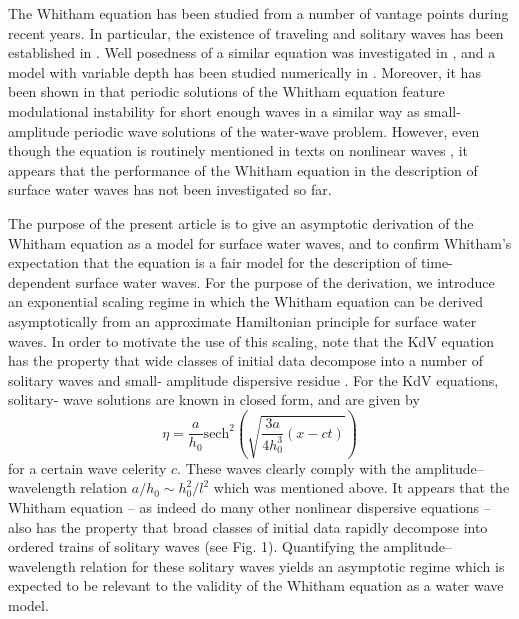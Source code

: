 The Whitham equation has been studied from a number of
vantage points during recent years. In particular, the existence of
traveling and solitary waves has been established in \citep{Ehrnstrom2012, Ehrnstrom2009}.
Well posedness of a similar equation was investigated in \citetext{\citealp[]{Lannes2013}-\citealp[]{Klein2015}}, and a
model with variable depth has been studied numerically in \cite{Minzoni2013}.
Moreover, it has been shown in \citep{Hur2015, Sanford2014} that periodic solutions of
the Whitham equation feature modulational instability for short
enough waves in a similar way as small-amplitude periodic wave
solutions of the water-wave problem. However, even though the
equation is routinely mentioned in texts on nonlinear waves \citep{Drazin89, Whitham74}, it appears that the performance of the Whitham equation in
the description of surface water waves has not been investigated
so far.


The purpose of the present article is to give an asymptotic
derivation of the Whitham equation as a model for surface water
waves, and to confirm Whitham’s expectation that the equation is
a fair model for the description of time-dependent surface water
waves. For the purpose of the derivation, we introduce an exponential scaling regime in which the Whitham equation can be derived asymptotically from an approximate Hamiltonian principle
for surface water waves. In order to motivate the use of this scaling,
note that the KdV equation has the property that wide classes of
initial data decompose into a number of solitary waves and small-
amplitude dispersive residue \cite{Ablowitz81}. For the KdV equations, solitary-
wave solutions are known in closed form, and are given by
%
\begin{equation}
	\eta = \frac{a}{h_0}\mbox{sech}^2\left(\sqrt{\frac{3a}{4h_0^3}(x - ct)}\right)
	\label{kdv-soliton}
\end{equation}
%
for a certain wave celerity $c$. These waves clearly comply with
the amplitude–wavelength relation $a / h_0 \sim h_0^2 / l^2$ which was
mentioned above. It appears that the Whitham equation – as indeed do many other nonlinear dispersive equations – also has
the property that broad classes of initial data rapidly decompose
into ordered trains of solitary waves (see Fig. 1). Quantifying the
amplitude–wavelength relation for these solitary waves yields an
asymptotic regime which is expected to be relevant to the validity
of the Whitham equation as a water wave model.


